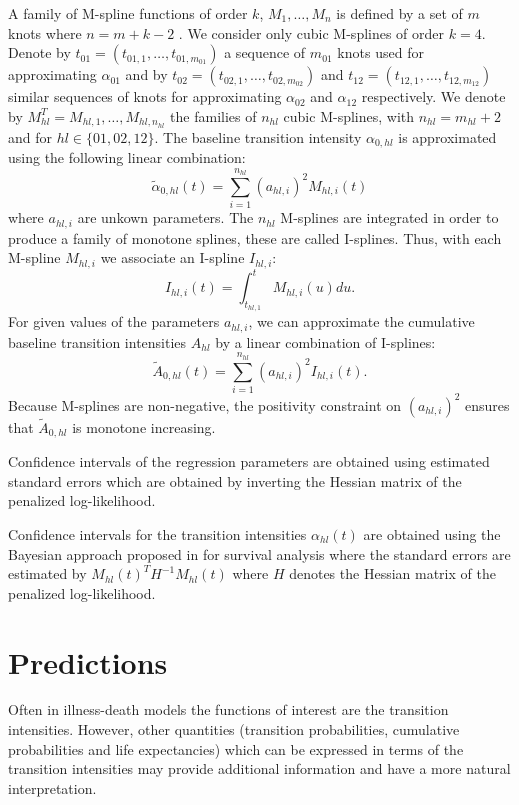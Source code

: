 \documentclass{article}
\begin{document}
A family of M-spline functions of order $k$, $M_1,\ldots,M_n$ is
defined by a set of $m$ knots where $n=m+k-2$ \citep{Ramsay_1988}. We
consider only cubic M-splines of order $k=4$. Denote by
$t_{01}=(t_{01,1},\dots,t_{01,m_{01}})$ a sequence of $m_{01}$ knots
used for 
approximating $\alpha_{01}$ and by
$t_{02}=(t_{02,1},\dots,t_{02,m_{02}})$ and
$t_{12}=(t_{12,1},\dots,t_{12,m_{12}})$ similar sequences of knots for
approximating $\alpha_{02}$ and $\alpha_{12}$ respectively. We
denote by $M_{hl}^T=M_{hl,1},\ldots,M_{hl,n_{hl}}$ the families of
$n_{hl}$ cubic M-splines, with $n_{hl}=m_{hl}+2$ and for $hl \in
\{01,02,12\}$. 
 The baseline transition intensity $\alpha_{0,hl}$ is approximated using
the following linear combination: $$ \tilde
\alpha_{0,hl}(t)=\sum_{i=1}^{n_{hl}} (a_{hl,i})^2 M_{hl,i}(t) $$ where
$a_{hl,i}$ are unkown parameters. The $n_{hl}$ M-splines are integrated in order to
produce a family of monotone splines, these are called
I-splines. Thus, with each M-spline $M_{hl,i}$ we associate an
I-spline $I_{hl,i}$: $$I_{hl,i}(t)=\int_{t_{hl,1}}^t M_{hl,i}(u) du.$$
For given values of the parameters $a_{hl,i}$, we can approximate the
cumulative baseline transition intensities $A_{hl}$ by a linear
combination of I-splines:
$$ \tilde A_{0,hl}(t)=\sum_{i=1}^{n_{hl}} (a_{hl,i})^2 I_{hl,i}(t).$$
Because M-splines are non-negative, the positivity constraint on
$(a_{hl,i})^2$ ensures that $\tilde A_{0,hl}$ is monotone increasing.

\medskip

Confidence intervals of the regression parameters are obtained using
estimated standard errors which are obtained by inverting the Hessian
matrix of the penalized log-likelihood.

Confidence intervals for the transition intensities $\alpha_{hl}(t)$
are obtained using the Bayesian approach proposed in
\citet{O'Sullivan_1988} for survival analysis where the standard
errors are estimated by $M_{hl}(t)^T H^{-1} M_{hl}(t)$ where $H$
denotes the Hessian matrix of the penalized log-likelihood.
\section{Predictions}
\label{sec-4}

Often in illness-death models the functions of interest are the
transition intensities.  However, other quantities (transition probabilities, cumulative probabilities and life
expectancies) which can be
expressed in terms of the transition intensities \citep{Touraine_2013}
may provide additional information and have a more natural
interpretation.
\end{document}
